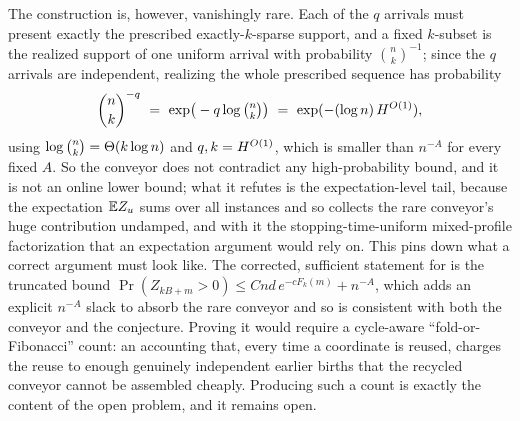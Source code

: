 The construction is, however, vanishingly rare. Each of the $q$ arrivals must present exactly the prescribed
exactly-$k$-sparse support, and a fixed $k$-subset is the realized support of one uniform arrival with probability
$\binom nk^{-1}$; since the $q$ arrivals are independent, realizing the whole prescribed sequence has probability
\[
  \binom nk^{-q}\ =\ \exp\!\big(-q\log\tbinom nk\big)\ =\ \exp(-(\log n)\,\Hscale^{\Oh(1)}),
\]
using $\log\binom nk=\Theta(k\log n)$ and $q,k=H^{O(1)}$, which is smaller than $n^{-A}$ for every fixed $A$. So the
conveyor does not contradict any high-probability bound, and it is not an online lower bound; what it refutes is the
expectation-level tail, because the expectation $\mathbb{E} Z_u$ sums over all instances and so collects the rare conveyor's huge
contribution undamped, and with it the stopping-time-uniform mixed-profile factorization that an expectation argument would
rely on. This pins down what a correct argument must look like. The corrected, sufficient statement for 
is the truncated bound $\Pr(Z_{kB+m}>0)\le Cnd\,e^{-cF_k(m)}+n^{-A}$, which adds an explicit $n^{-A}$ slack to absorb the rare
conveyor and so is consistent with both the conveyor and the conjecture. Proving it would require a cycle-aware
``fold-or-Fibonacci'' count: an accounting that, every time a coordinate is reused, charges the reuse to enough genuinely
independent earlier births that the recycled conveyor cannot be assembled cheaply. Producing such a count is exactly the
content of the open problem, and it remains open.
